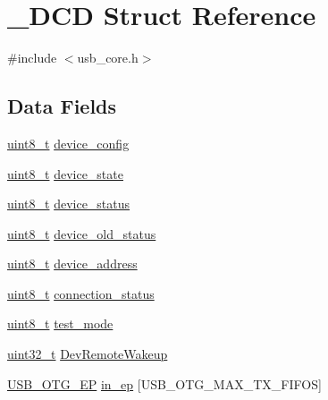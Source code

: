 \hypertarget{struct___d_c_d}{\section{\-\_\-\-D\-C\-D Struct Reference}
\label{struct___d_c_d}
}


{\ttfamily \#include $<$usb\-\_\-core.\-h$>$}

\subsection*{Data Fields}
\begin{DoxyCompactItemize}
\item 
\hyperlink{stdint_8h_aba7bc1797add20fe3efdf37ced1182c5}{uint8\-\_\-t} \hyperlink{struct___d_c_d_a1d220b3eff4ee2e13baa868155edece3}{device\-\_\-config}
\item 
\hyperlink{stdint_8h_aba7bc1797add20fe3efdf37ced1182c5}{uint8\-\_\-t} \hyperlink{struct___d_c_d_a3b318cb09f70b15aaea0aaa17c61e943}{device\-\_\-state}
\item 
\hyperlink{stdint_8h_aba7bc1797add20fe3efdf37ced1182c5}{uint8\-\_\-t} \hyperlink{struct___d_c_d_a0a6de2a3b497713b014ec306a3fc5e92}{device\-\_\-status}
\item 
\hyperlink{stdint_8h_aba7bc1797add20fe3efdf37ced1182c5}{uint8\-\_\-t} \hyperlink{struct___d_c_d_af4c781790689d2aa0c23ed2a928d14d3}{device\-\_\-old\-\_\-status}
\item 
\hyperlink{stdint_8h_aba7bc1797add20fe3efdf37ced1182c5}{uint8\-\_\-t} \hyperlink{struct___d_c_d_aeb1db0c0aeccfb65ef9274ae11e1d2ab}{device\-\_\-address}
\item 
\hyperlink{stdint_8h_aba7bc1797add20fe3efdf37ced1182c5}{uint8\-\_\-t} \hyperlink{struct___d_c_d_a7fe0642fd4366eeed640ebdb46e5c0f2}{connection\-\_\-status}
\item 
\hyperlink{stdint_8h_aba7bc1797add20fe3efdf37ced1182c5}{uint8\-\_\-t} \hyperlink{struct___d_c_d_ae0e60d9096dd9ef454fa7ff632ea336b}{test\-\_\-mode}
\item 
\hyperlink{stdint_8h_a435d1572bf3f880d55459d9805097f62}{uint32\-\_\-t} \hyperlink{struct___d_c_d_af37628bba9e86a2ccc12b0c377147150}{Dev\-Remote\-Wakeup}
\item 
\hyperlink{group___u_s_b___c_o_r_e___exported___types_gad1c65925021e8dac88858e10bb2a7eea}{U\-S\-B\-\_\-\-O\-T\-G\-\_\-\-E\-P} \hyperlink{struct___d_c_d_aca1551bdcee60a9fae805f0e7365cc7a}{in\-\_\-ep} \mbox{[}U\-S\-B\-\_\-\-O\-T\-G\-\_\-\-M\-A\-X\-\_\-\-T\-X\-\_\-\-F\-I\-F\-O\-S\mbox{]}

\end{DoxyCompactItemize}
